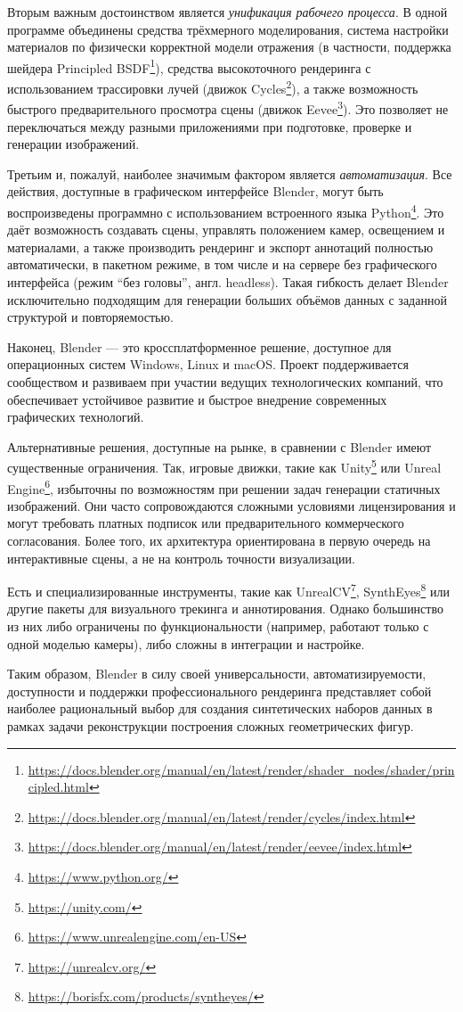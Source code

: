 Вторым важным достоинством является \emph{унификация рабочего процесса}. В одной
программе объединены средства трёхмерного моделирования, система настройки
материалов по физически корректной модели отражения (в частности, поддержка
шейдера Principled
BSDF\footnote{\url{https://docs.blender.org/manual/en/latest/render/shader_nodes/shader/principled.html}}),
средства высокоточного рендеринга с использованием трассировки лучей (движок
Cycles\footnote{\url{https://docs.blender.org/manual/en/latest/render/cycles/index.html}}),
а также возможность быстрого предварительного просмотра сцены (движок
Eevee\footnote{\url{https://docs.blender.org/manual/en/latest/render/eevee/index.html}}).
Это позволяет не переключаться между разными приложениями при подготовке,
проверке и генерации изображений.

Третьим и, пожалуй, наиболее значимым фактором является \emph{автоматизация}.
Все действия, доступные в графическом интерфейсе Blender, могут быть
воспроизведены программно с использованием встроенного языка
Python\footnote{\url{https://www.python.org/}}. Это даёт возможность создавать
сцены, управлять положением камер, освещением и материалами, а также производить
рендеринг и экспорт аннотаций полностью автоматически, в пакетном режиме, в том
числе и на сервере без графического интерфейса (режим ``без головы'', англ.
headless). Такая гибкость делает Blender исключительно подходящим для генерации
больших объёмов данных с заданной структурой и повторяемостью.

Наконец, Blender — это кроссплатформенное решение, доступное для операционных
систем Windows, Linux и macOS. Проект поддерживается сообществом и развиваем при
участии ведущих технологических компаний, что обеспечивает устойчивое развитие и
быстрое внедрение современных графических технологий.

Альтернативные решения, доступные на рынке, в сравнении с Blender имеют
существенные ограничения. Так, игровые движки, такие как
Unity\footnote{\url{https://unity.com/}} или Unreal
Engine\footnote{\url{https://www.unrealengine.com/en-US}}, избыточны по
возможностям при решении задач генерации статичных изображений. Они часто
сопровождаются сложными условиями лицензирования и могут требовать платных
подписок или предварительного коммерческого согласования.  Более того, их
архитектура ориентирована в первую очередь на интерактивные сцены, а не на
контроль точности визуализации.

Есть и специализированные инструменты, такие как
UnrealCV\footnote{\url{https://unrealcv.org/}},
SynthEyes\footnote{\url{https://borisfx.com/products/syntheyes/}} или другие
пакеты для визуального трекинга и аннотирования. Однако большинство из них либо
ограничены по функциональности (например, работают только с одной моделью
камеры), либо сложны в интеграции и настройке.

Таким образом, Blender в силу своей универсальности, автоматизируемости,
доступности и поддержки профессионального рендеринга представляет собой наиболее
рациональный выбор для создания синтетических наборов данных в рамках задачи
реконструкции построения сложных геометрических фигур.

